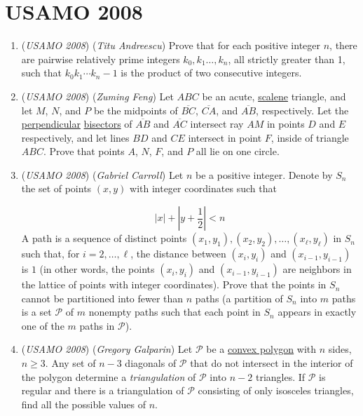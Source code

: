 \section{USAMO 2008}
        \begin{enumerate}
        	\item (\textit{USAMO 2008}) (\textit{Titu Andreescu}) Prove that for each positive integer $n$, there are pairwise relatively prime integers $k_0,k_1\ldots,k_n$, all strictly greater than 1, such that $k_0k_1\cdots k_n-1$ is the product of two consecutive integers.


 

	\item (\textit{USAMO 2008}) (\textit{Zuming Feng}) Let $ABC$ be an acute, \href{https://artofproblemsolving.com/wiki/index.php?title=Scalene}{scalene} triangle, and let $M$, $N$, and $P$ be the midpoints of $\overline{BC}$, $\overline{CA}$, and $\overline{AB}$, respectively. Let the \href{https://artofproblemsolving.com/wiki/index.php?title=Perpendicular}{perpendicular} \href{https://artofproblemsolving.com/wiki/index.php?title=Bisect}{bisectors} of $\overline{AB}$ and $\overline{AC}$ intersect ray $AM$ in points $D$ and $E$ respectively, and let lines $BD$ and $CE$ intersect in point $F$, inside of triangle $ABC$. Prove that points $A$, $N$, $F$, and $P$ all lie on one circle.


 

	\item (\textit{USAMO 2008}) (\textit{Gabriel Carroll}) Let $n$ be a positive integer. Denote by $S_n$ the set of points $(x, y)$ with integer coordinates such that

 \[\left|x\right|+\left|y+\frac{1}{2}\right|<n\]
A path is a sequence of distinct points $(x_1,y_1),(x_2,y_2),\ldots,(x_\ell,y_\ell)$ in $S_n$ such that, for $i=2,\ldots,\ell$, the distance between $(x_i,y_i)$ and $(x_{i-1},y_{i-1})$ is $1$ (in other words, the points $(x_i,y_i)$ and $(x_{i-1},y_{i-1})$ are neighbors in the lattice of points with integer coordinates). Prove that the points in $S_n$ cannot be partitioned into fewer than $n$ paths (a partition of $S_n$ into $m$ paths is a set $\mathcal{P}$ of $m$ nonempty paths such that each point in $S_n$ appears in exactly one of the $m$ paths in $\mathcal{P}$).


 

	\item (\textit{USAMO 2008}) (\textit{Gregory Galparin}) Let $\mathcal{P}$ be a \href{https://artofproblemsolving.com/wiki/index.php?title=Convex\_polygon}{convex polygon} with $n$ sides, $n\ge3$. Any set of $n-3$ diagonals of $\mathcal{P}$ that do not intersect in the interior of the polygon determine a \textit{triangulation} of $\mathcal{P}$ into $n - 2$ triangles. If $\mathcal{P}$ is regular and there is a triangulation of $\mathcal{P}$ consisting of only isosceles triangles, find all the possible values of $n$.



\end{enumerate}
